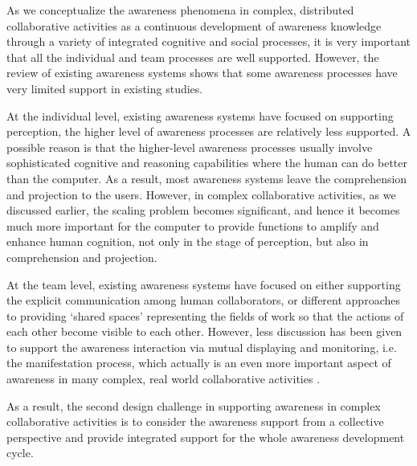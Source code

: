 As we conceptualize the awareness phenomena in complex, distributed collaborative activities as a continuous development of awareness knowledge through a variety of integrated cognitive and social processes, it is very important that all the individual and team processes are well supported. However, the review of existing awareness systems shows that some awareness processes have very limited support in existing studies.

At the individual level, existing awareness systems have focused on supporting perception, the higher level of awareness processes are relatively less supported. A possible reason is that the higher-level awareness processes usually involve sophisticated cognitive and reasoning capabilities where the human can do better than the computer. As a result, most awareness systems leave the comprehension and projection to the users. However, in complex collaborative activities, as we discussed earlier, the scaling problem becomes significant, and hence it becomes much more important for the computer to provide functions to amplify and enhance human cognition, not only in the stage of perception, but also in comprehension and projection. 

At the team level, existing awareness systems have focused on either supporting the explicit communication among human collaborators, or different approaches to providing `shared spaces' representing the fields of work so that the actions of each other become visible to each other. However, less discussion has been given to support the awareness interaction via mutual displaying and monitoring, i.e. the manifestation process, which actually is an even more important aspect of awareness in many complex, real world collaborative activities \cite{heath2002a}.

As a result, the second design challenge in supporting awareness in complex collaborative activities is to consider the awareness support from a collective perspective and provide integrated support for the whole awareness development cycle.




 

